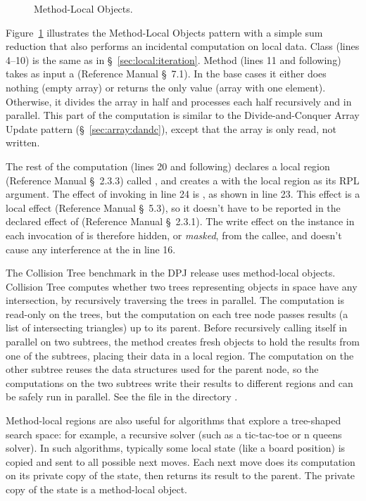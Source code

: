\begin{figure}

\caption{Method-Local Objects.}
\label{fig:local:method:pattern}
\end{figure}

Figure~\ref{fig:local:method:pattern} illustrates the Method-Local
Objects pattern with a simple sum reduction that also performs an
incidental computation on local data.  Class  (lines
4--10) is the same as in \S~\ref{sec:local:iteration}.  Method
 (lines 11 and following) takes as input a
 (Reference Manual \S~7.1).  In the base cases it
either does nothing (empty array) or returns the only value (array
with one element).  Otherwise, it divides the array in half and
processes each half recursively and in parallel.  This part of the
computation is similar to the Divide-and-Conquer Array Update pattern
(\S~\ref{sec:array:dandc}), except that the array is only read, not
written.

The rest of the computation (lines 20 and following) declares a local
region (Reference Manual \S~2.3.3) called , and
creates a  with the local region as its RPL argument.
The effect of invoking  in line 24 is
, as shown in line 23.  This effect is a local
effect (Reference Manual \S~5.3), so it doesn't have to be reported in
the declared effect of  (Reference Manual \S~2.3.1).
The write effect on the  instance in each invocation
of  is therefore hidden, or \emph{masked}, from the
callee, and doesn't cause any interference at the  in
line 16.


 The Collision Tree benchmark in the DPJ
release uses method-local objects.  Collision Tree computes whether
two trees representing objects in space have any intersection, by
recursively traversing the trees in parallel.  The computation is
read-only on the trees, but the computation on each tree node passes
results (a list of intersecting triangles) up to its parent.  Before
recursively calling itself in parallel on two subtrees, the
 method creates fresh objects to hold the results
from one of the subtrees, placing their data in a local region.
The computation on the other subtree reuses the data structures 
used for the parent node, so the computations on the two subtrees
write their results to different regions and can be safely run in
parallel.  See the file  in the directory
.

Method-local regions are also useful for algorithms that explore a
tree-shaped search space: for example, a recursive solver (such as a
tic-tac-toe or n queens solver).  In such algorithms, typically some
local state (like a board position) is copied and sent to all possible
next moves.  Each next move does its computation on its private copy
of the state, then returns its result to the parent.  The private copy
of the state is a method-local object.

